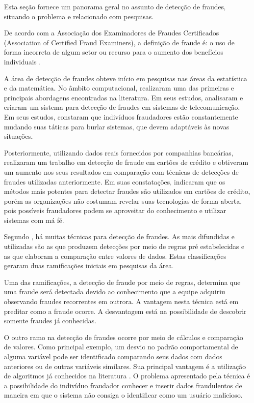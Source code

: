 \documentclass[smallextended]{svjour3}
\begin{document}
Esta seção fornece um panorama geral no assunto de detecção de fraudes, situando o problema e relacionado com pesquisas.

De acordo com a Associação dos Examinadores de Fraudes Certificados (Association of Certified Fraud Examiners), a definição de fraude é: o uso de forma incorreta de algum setor ou recurso para o aumento dos benefícios individuais \citep{Abdallah2016}.

A área de detecção de fraudes obteve início em pesquisas nas áreas da estatística e da matemática. No âmbito computacional, \cite{Fawcett1997} realizaram uma das primeiras e principais abordagens encontradas na literatura. Em seus estudos, analisaram e criaram um sistema para detecção de fraudes em sistemas de telecomunicação. Em seus estudos, constaram que indivíduos fraudadores estão constantemente mudando suas táticas para burlar sistemas, que devem adaptáveis às novas situações.

Posteriormente, utilizando dados reais fornecidos por companhias bancárias, \cite{809570} realizaram um trabalho em detecção de fraude em cartões de crédito e obtiveram um aumento nos seus resultados em comparação com técnicas de detecções de fraudes utilizadas anteriormente. Em suas constatações, indicaram que os métodos mais potentes para detectar fraudes são utilizados em cartões de crédito, porém as organizações não costumam revelar suas tecnologias de forma aberta, pois possíveis fraudadores podem se aproveitar do conhecimento e utilizar sistemas com má fé.

Segundo \cite{Fawcett1997}, há muitas técnicas para detecção de fraudes. As mais difundidas e utilizadas são as que produzem detecções por meio de regras pré estabelecidas e as que elaboram a comparação entre valores de dados. Estas classificações geraram duas ramificações iniciais em pesquisas da área.

Uma das ramificações, a detecção de fraude por meio de regras, determina que uma fraude será detectada devido ao conhecimento que a equipe adquiriu observando fraudes recorrentes em outrora. A vantagem nesta técnica está em preditar como a fraude ocorre. A desvantagem está na possibilidade de descobrir somente fraudes já conhecidas.

O outro ramo na detecção de fraudes ocorre por meio de cálculos e comparação de valores. Como principal exemplo, um desvio no padrão comportamental de alguma variável pode ser identificado comparando seus dados com dados anteriores ou de outras variáveis similares. Sua principal vantagem é a utilização de algoritmos já conhecidos na literatura \citep{Fawcett1997}. O problema apresentado pela técnica é a possibilidade do indivíduo fraudador conhecer e inserir dados fraudulentos de maneira em que o sistema não consiga o identificar como um usuário malicioso.
\end{document}
